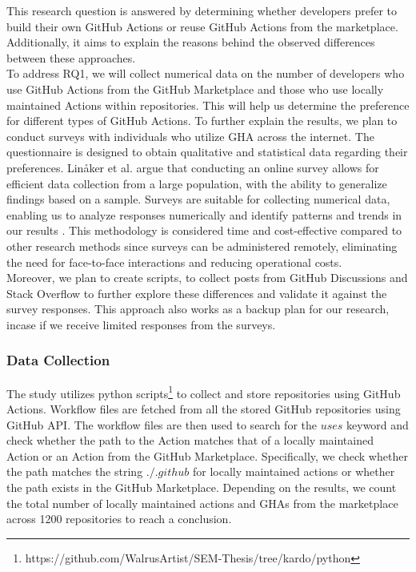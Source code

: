 \documentclass[conference]{IEEEtran}
\begin{document}
        This research question is answered by determining whether developers prefer to build their own GitHub Actions or reuse GitHub Actions from the marketplace. Additionally, it aims to explain the reasons behind the observed differences between these approaches.\\

        To address RQ1, we will collect numerical data on the number of developers who use GitHub Actions from the GitHub Marketplace and those who use locally maintained Actions within repositories. This will help us determine the preference for different types of GitHub Actions. To further explain the results, we plan to conduct surveys with individuals who utilize GHA across the internet. The questionnaire is designed to obtain qualitative and statistical data regarding their preferences. Linåker et al. \cite{linaker2013guidelines} argue that conducting an online survey allows for efficient data collection from a large population, with the ability to generalize findings based on a sample. Surveys are suitable for collecting numerical data, enabling us to analyze responses numerically and identify patterns and trends in our results \cite{fowler2009survey}. This methodology is considered time and cost-effective compared to other research methods since surveys can be administered remotely, eliminating the need for face-to-face interactions and reducing operational costs.\\

	Moreover, we plan to create scripts, to collect posts from GitHub Discussions and Stack Overflow to further explore these differences and validate it against the survey responses. This approach also works as a backup plan for our research, incase if we receive limited responses from the surveys.\\

        \subsubsection{\textbf{Data Collection}}
	  The study utilizes python scripts\footnote{https://github.com/WalrusArtist/SEM-Thesis/tree/kardo/python} to collect and store repositories using GitHub Actions. Workflow files are fetched from all the stored GitHub repositories using GitHub API.  The workflow files are then used to search for the $uses$ keyword and check whether the path to the Action matches that of a locally maintained Action or an Action from the GitHub Marketplace. Specifically, we check whether the path matches the string $./.github$ for locally maintained actions or whether the path exists in the GitHub Marketplace. Depending on the results, we count the total number of locally maintained actions and GHAs from the marketplace across 1200 repositories to reach a conclusion.\\
\end{document}
